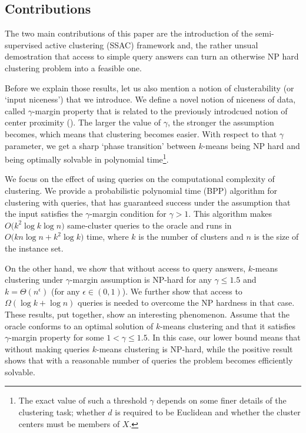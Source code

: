 \documentclass{article}
\begin{document}
\subsection{Contributions}
The two main contributions of this paper are the introduction of the semi-supervised active clustering (SSAC) framework and, the rather unsual 
demostration that access to simple query answers can turn an otherwise NP hard clustering problem into a feasible one. 

Before we explain those results, let us also mention a notion of clusterability (or `input niceness') that we introduce. We define a novel notion of niceness of data, called $\gamma$-margin property that is related to the previously introdcued notion of center proximity (\cite{awasthi2012center}). The larger the value of $\gamma$, the stronger the assumption becomes, which means that clustering becomes easier. With respect to that $\gamma$ parameter, we get a sharp `phase transition' between $k$-means being NP hard and being optimally solvable in polynomial time\footnote{The exact value of such a threshold $\gamma$ depends on some finer details of the clustering task; whether $d$ is required to be Euclidean and whether the cluster centers must be members of $X$.}.

We focus on the effect of using queries on the computational complexity of clustering. We provide a probabilistic polynomial time (BPP) algorithm for clustering with queries, that has guaranteed success under the assumption that the input satisfies the $\gamma$-margin condition for $\gamma > 1$. This algorithm makes $O\big(k^2\log k\log n)$ same-cluster queries to the oracle and runs in $O\big(kn\log n + k^2\log k)$ time, where $k$ is the number of clusters and $n$ is the size of the instance set.

On the other hand, we show that without access to query answers, $k$-means clustering under $\gamma$-margin assumption is NP-hard for any $\gamma \leq 1.5$ and $k=\Theta(n^\epsilon)$ (for any $\epsilon\in (0,1)$). We further show that access to $\Omega(\log k + \log n)$ queries is needed to overcome the NP hardness in that case.
These results, put together, show an interesting phenomenon. Assume that the oracle conforms to an optimal solution of $k$-means clustering and that it satisfies $\gamma$-margin property for some $1<\gamma \leq 1.5$. In this case, our lower bound means that without making queries $k$-means clustering is NP-hard, while the positive result shows that with a reasonable number of queries the problem becomes efficiently solvable.  
\end{document}
